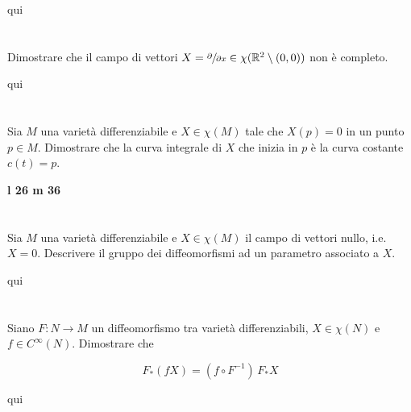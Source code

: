 qui

\section{}\label{es2-31}

\begin{tcolorbox}
	Dimostrare che il campo di vettori $ X = \sfrac{\partial}{\partial x} \in \chi(\mathbb{R}^{2} \setminus (0,0)) $ non è completo.
\end{tcolorbox}

qui

\section{}\label{es2-32}

\begin{tcolorbox}
	Sia $ M $ una varietà differenziabile e $ X \in \chi(M) $ tale che $ X(p) = 0 $ in un punto $ p \in M $. Dimostrare che la curva integrale di $ X $ che inizia in $ p $ è la curva costante $ c(t)=p $.
\end{tcolorbox}

\textbf{l 26 m 36}

\section{}\label{es2-33}

\begin{tcolorbox}
	Sia $ M $ una varietà differenziabile e $ X \in \chi(M) $ il campo di vettori nullo, i.e. $ X = 0 $. Descrivere il gruppo dei diffeomorfismi ad un parametro associato a $ X $.
\end{tcolorbox}

qui

\section{}\label{es2-34}

\begin{tcolorbox}
	Siano $ F : N \to M $ un diffeomorfismo tra varietà differenziabili, $ X \in \chi(N) $ e $ f \in C^{\infty}(N) $. Dimostrare che
	
	\begin{equation}
		F_{*}(f X) = (f \circ F^{-1}) \, F_{*} X
	\end{equation}
\end{tcolorbox}

qui

